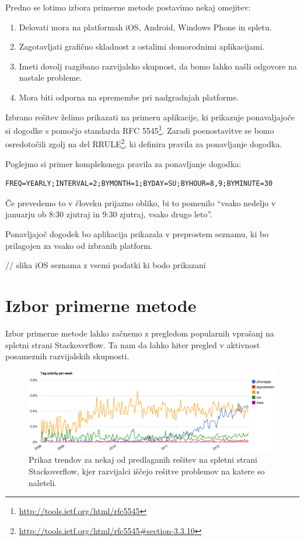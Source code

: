 Predno se lotimo izbora primerne metode postavimo nekaj omejitev:

\begin{enumerate}
  \item Delovati mora na platformah iOS, Android, Windows Phone in spletu.
  \item Zagotavljati grafično skladnost z ostalimi domorodnimi aplikacijami.
  \item Imeti dovolj razgibano razvijalsko skupnost, da bomo lahko našli odgovore na nastale probleme.
  \item Mora biti odporna na spremembe pri nadgradnjah platforme.
\end{enumerate}

Izbrano rešitev želimo prikazati na primeru aplikacije, ki prikazuje ponavaljajoče si dogodke s pomočjo standarda RFC 5545\footnote{\href{http://tools.ietf.org/html/rfc5545}{http://tools.ietf.org/html/rfc5545}}. Zaradi poenostavitve se bomo osredotočili zgolj na del RRULE{\footnote{\href{http://tools.ietf.org/html/rfc5545\#section-3.3.10}{http://tools.ietf.org/html/rfc5545\#section-3.3.10}}}, ki definira pravila za ponavljanje dogodka.

Poglejmo si primer kompleksnega pravila za ponavljanje dogodka:

\begin{lstlisting}
FREQ=YEARLY;INTERVAL=2;BYMONTH=1;BYDAY=SU;BYHOUR=8,9;BYMINUTE=30
\end{lstlisting}

Če prevedemo to v človeku prijazno obliko, bi to pomenilo ``vsako nedeljo v januarju ob 8:30 zjutraj in 9:30 zjutraj, vsako drugo leto''.

Ponavljajoč dogodek bo aplikacija prikazala v preprostem seznamu, ki bo prilagojen za vsako od izbranih platform.

// slika iOS seznama z vsemi podatki ki bodo prikazani

\section{Izbor primerne metode}

Izbor primerne metode lahko začnemo z pregledom popularnih vprašanj na spletni strani Stackoverflow. Ta nam da lahko hiter pregled v aktivnost posameznih razvijalskih skupnosti.

\begin{figure}
 \includegraphics[width=\linewidth]{stackoverflow-trends}
 \caption{Prikaz trendov za nekaj od predlaganih rešitev na spletni strani Stackoverflow, kjer razvijalci iščejo rešitve problemov na katere so naleteli.}
 \label{fig:stackoverflow-trends}
\end{figure}

